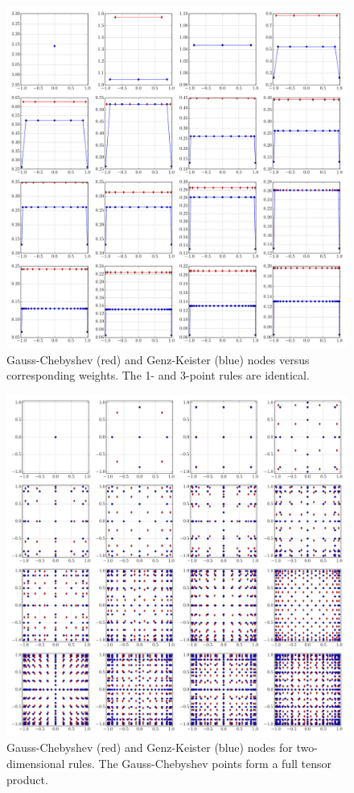\documentclass[a4paper,10pt]{article}
\begin{document}
\begin{figure}[h]
  \centering
  \includegraphics[width=\linewidth]{./img/gk_chebyshevt_nodes_1d.pdf}
  \caption{Gauss-Chebyshev (red) and Genz-Keister (blue) nodes versus
  corresponding weights. The 1- and 3-point rules are identical.}
  \label{fig:gk_chebyshevt_nodes_1d}
\end{figure}

\begin{figure}[h]
  \centering
  \includegraphics[width=\linewidth]{./img/gk_chebyshevt_nodes_2d.pdf}
  \caption{Gauss-Chebyshev (red) and Genz-Keister (blue) nodes for
  two-dimensional rules. The Gauss-Chebyshev points form a full tensor
  product.}
  \label{fig:gk_chebyshevt_nodes_2d}
\end{figure}
\end{document}
